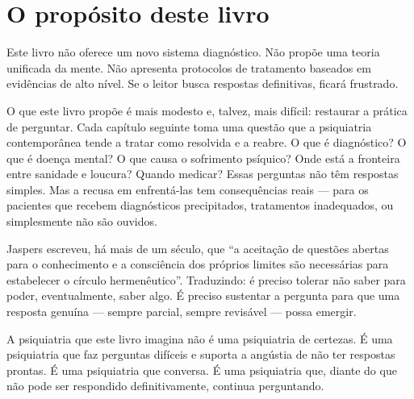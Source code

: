 \section{O propósito deste livro}
\label{sec:proposito}

Este livro não oferece um novo sistema diagnóstico. Não propõe uma teoria unificada da mente. Não apresenta protocolos de tratamento baseados em evidências de alto nível. Se o leitor busca respostas definitivas, ficará frustrado.

O que este livro propõe é mais modesto e, talvez, mais difícil: restaurar a prática de perguntar. Cada capítulo seguinte toma uma questão que a psiquiatria contemporânea tende a tratar como resolvida e a reabre. O que é diagnóstico? O que é doença mental? O que causa o sofrimento psíquico? Onde está a fronteira entre sanidade e loucura? Quando medicar? Essas perguntas não têm respostas simples. Mas a recusa em enfrentá-las tem consequências reais --- para os pacientes que recebem diagnósticos precipitados, tratamentos inadequados, ou simplesmente não são ouvidos.

Jaspers escreveu, há mais de um século, que \enquote{a aceitação de questões abertas para o conhecimento e a consciência dos próprios limites são necessárias para estabelecer o círculo hermenêutico}. Traduzindo: é preciso tolerar não saber para poder, eventualmente, saber algo. É preciso sustentar a pergunta para que uma resposta genuína --- sempre parcial, sempre revisável --- possa emergir.

A psiquiatria que este livro imagina não é uma psiquiatria de certezas. É uma psiquiatria que faz perguntas difíceis e suporta a angústia de não ter respostas prontas. É uma psiquiatria que conversa. É uma psiquiatria que, diante do que não pode ser respondido definitivamente, continua perguntando.

